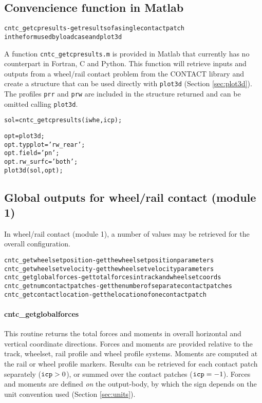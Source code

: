 \documentclass[12pt]{report}
\begin{document}
\subsection{Convencience function in Matlab}

\begin{alltt}\small
cntc_getcpresults             - get results of a single contact patch
                                in the form used by loadcase and plot3d
\end{alltt}

A function {\tt cntc\_getcpresults.m} is provided in Matlab that currently
has no counterpart in Fortran, C and Python. This function will retrieve
inputs and outputs from a wheel/rail contact problem from the CONTACT
library and create a structure that can be used directly with {\tt plot3d}
(Section \ref{sec:plot3d}). The profiles {\tt prr} and {\tt prw} are
included in the structure returned and can be omitted calling {\tt plot3d}.
\begin{alltt}\small
   sol = cntc_getcpresults(iwhe, icp);

   opt = plot3d;
   opt.typplot  = 'rw_rear';
   opt.field    = 'pn';
   opt.rw_surfc = 'both';
   plot3d(sol, opt);
\end{alltt}

\subsection{Global outputs for wheel/rail contact (module 1)}
\label{sec:global_output1}

In wheel/rail contact (module 1), a number of values may be retrieved for
the overall configuration.
\begin{alltt}\small
cntc_getwheelsetposition    - get the wheelset position parameters
cntc_getwheelsetvelocity    - get the wheelset velocity parameters
cntc_getglobalforces        - get total forces in track and wheelset coords
cntc_getnumcontactpatches   - get the number of separate contact patches
cntc_getcontactlocation     - get the location of one contact patch
\end{alltt}

\paragraph{cntc\_getglobalforces}

This routine returns the total forces and moments in overall horizontal and
vertical coordinate directions. Forces and moments are provided relative to
the track, wheelset, rail profile and wheel profile systems.  Moments are
computed at the rail or wheel profile markers.  Results can be retrieved
for each contact patch separately (${\tt icp}>0$), or summed over the
contact patches (${\tt icp}=-1$).  Forces and moments are defined {\em
on\/} the output-body, by which the sign depends on the unit convention
used (Section \ref{sec:units}).
\end{document}
